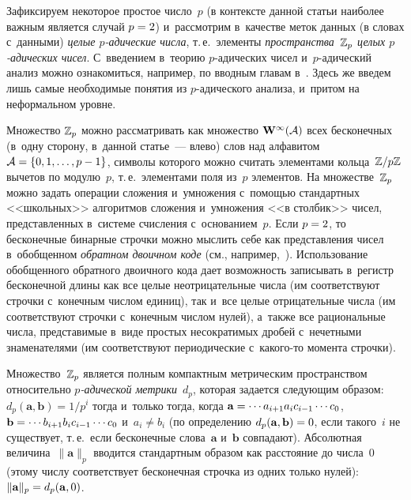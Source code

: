 \begin{multicols}{2}
Зафиксируем некоторое простое число~$p$ (в контексте данной статьи наиболее важным
является случай $p\hm=2$) и~рассмотрим в~качестве меток данных (в словах с~данными) \textit{целые $p$-адические
числа}, т.\,е.\ элементы \textit{пространства~$\mathbb{Z}_p$ 
целых $p$-ади\-че\-ских чисел}. С~введением в~теорию $p$-ади\-че\-ских
чисел и~$p$-ади\-че\-ский анализ можно ознакомиться, например,
по вводным главам в~\cite{AnKhr}. Здесь же введем  лишь
самые необходимые понятия
из $p$-ади\-че\-ско\-го анализа, и~притом на неформальном уровне.

Множество $\mathbb{Z}_p$ можно рассматривать как множество $\mathbf W^\infty (\mathcal A)$ 
всех бесконечных (в~одну
сторону, в~данной статье~--- влево)
слов над алфавитом $\Cal A\hm=\{0,1,\ldots,p-1\}$, символы которого можно считать
элементами кольца~$\mathbb{Z}/p\mathbb{Z}$ вычетов по модулю~$p$, 
т.\,е.\ элементами поля из~$p$ элементов. 
На множестве~$\mathbb{Z}_p$ можно задать операции сложения и~умножения
с~по\-мощью стандартных <<школьных>> алгоритмов сложения и~умножения <<в столбик>>
чисел, пред\-став\-лен\-ных в~сис\-те\-ме счис\-ле\-ния с~основанием~$p$.
Если $p\hm=2$, то бесконечные бинарные строч\-ки можно мыслить себе
как представления чисел в~обобщенном \textit{обратном двоичном коде}
(см., например,~\cite[с.~213]{Knuth}).  Использование
обобщенного обратного двоичного кода дает возможность записывать в~регистр 
бесконечной длины как все целые неотрицательные
чис\-ла (им соответствуют строчки с~конечным числом единиц), так и~все 
целые отрицательные
чис\-ла (им соответствуют строчки с~конечным числом нулей), а~также все рациональные
чис\-ла, пред\-ста\-ви\-мые в~виде простых несократимых дробей с~нечетными знаменателями
(им соответствуют периодические с~ка\-ко\-го-то момента строчки).

Множество~$\mathbb{Z}_p$  является  полным компактным метрическим пространством относительно
\textit{$p$-ади\-че\-ской метрики}~$d_p$, которая задается следующим образом:
$d_p(\mathbf a,\mathbf b)={1}/{p^i}$
тогда и~только тогда, когда
$\mathbf a\hm=\cdots a_{i+1}a_{i} {c_{i-1}\cdots
c_0}$, $\mathbf b\hm=\cdots b_{i+1}b_{i} {c_{i-1}\cdots c_0}$
и~$a_{i}\ne b_{i}$ (по определению  $d_p(\mathbf a,\mathbf b)\hm=0$, если такого~$i$ 
не существует, т.\,е.\ если бесконечные слова~$\mathbf a$ и~$\mathbf b$
совпадают). Абсолютная величина~$\|\mathbf a\|_p$ вводится стандартным образом
как расстояние до  числа~0 (этому числу соответствует бесконечная строчка
из одних только нулей): $\|\mathbf a\|_p\hm=d_p(\mathbf a,0)$.


\end{multicols}
